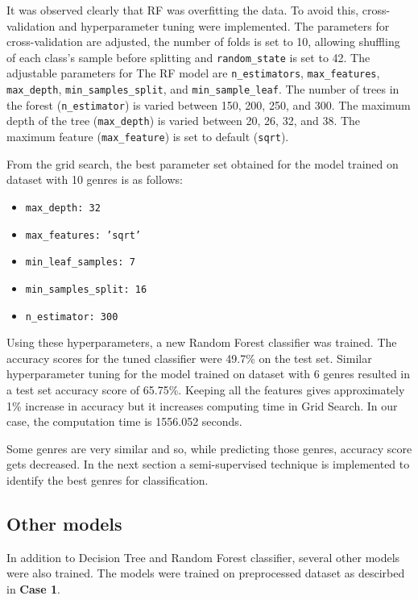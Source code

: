 \documentclass[conference]{IEEEtran}
\begin{document}
It was observed clearly that RF was overfitting the data. To avoid this, cross-validation and hyperparameter tuning were implemented. The parameters for cross-validation are adjusted, the number of folds is set to 10, allowing shuffling of each class’s sample before splitting and \texttt{random\_state} is set to 42. The adjustable parameters for The RF model are \texttt{n\_estimators}, \texttt{max\_features}, \texttt{max\_depth}, \texttt{min\_samples\_split}, and \texttt{min\_sample\_leaf}. The number of trees in the forest (\texttt{n\_estimator}) is varied between 150, 200, 250, and 300. The maximum depth of the tree (\texttt{max\_depth}) is varied between 20, 26, 32, and 38. The maximum feature (\texttt{max\_feature}) is set to default (\texttt{sqrt}).

From the grid search, the best parameter set obtained for the model trained on dataset with 10 genres is as follows:
\begin{itemize}
\item \texttt{max\_depth: 32}
\item \texttt{max\_features: 'sqrt'}
\item \texttt{min\_leaf\_samples: 7}
\item \texttt{min\_samples\_split: 16}
\item \texttt{n\_estimator: 300}
\end{itemize}

Using these hyperparameters, a new Random Forest classifier was trained. The accuracy scores for the tuned classifier were 49.7\% on the test set. Similar hyperparameter tuning for the model trained on dataset with 6 genres resulted in a test set accuracy score of 65.75\%. Keeping all the features gives approximately 1\% increase in accuracy but it increases computing time in Grid Search. In our case, the computation time is 1556.052 seconds.

Some genres are very similar and so, while predicting those genres, accuracy score gets decreased. In the next section a semi-supervised technique is implemented to identify the best genres for classification.

\subsection{Other models}
\label{sec:org9a42563}

In addition to Decision Tree and Random Forest classifier, several other models were also trained. The models were trained on preprocessed dataset as descirbed in \textbf{\textbf{Case 1}}. 
\end{document}
